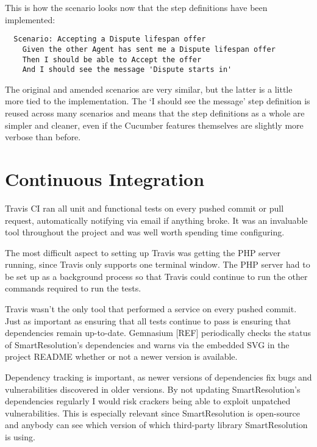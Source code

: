 This is how the scenario looks now that the step definitions have been implemented:

\begin{lstlisting}
  Scenario: Accepting a Dispute lifespan offer
    Given the other Agent has sent me a Dispute lifespan offer
    Then I should be able to Accept the offer
    And I should see the message 'Dispute starts in'
\end{lstlisting}

The original and amended scenarios are very similar, but the latter is a little more tied to the implementation. The `I should see the message' step definition is reused across many scenarios and means that the step definitions as a whole are simpler and cleaner, even if the Cucumber features themselves are slightly more verbose than before.

\section{Continuous Integration}

Travis CI ran all unit and functional tests on every pushed commit or pull request, automatically notifying via email if anything broke. It was an invaluable tool throughout the project and was well worth spending time configuring.

The most difficult aspect to setting up Travis was getting the PHP server running, since Travis only supports one terminal window. The PHP server had to be set up as a background process so that Travis could continue to run the other commands required to run the tests.

Travis wasn't the only tool that performed a service on every pushed commit. Just as important as ensuring that all tests continue to pass is ensuring that dependencies remain up-to-date. Gemnasium [REF] periodically checks the status of SmartResolution's dependencies and warns via the embedded SVG in the project README whether or not a newer version is available. %

Dependency tracking is important, as newer versions of dependencies fix bugs and vulnerabilities discovered in older versions. By not updating SmartResolution's dependencies regularly I would risk crackers being able to exploit unpatched vulnerabilities. This is especially relevant since SmartResolution is open-source and anybody can see which version of which third-party library SmartResolution is using.


